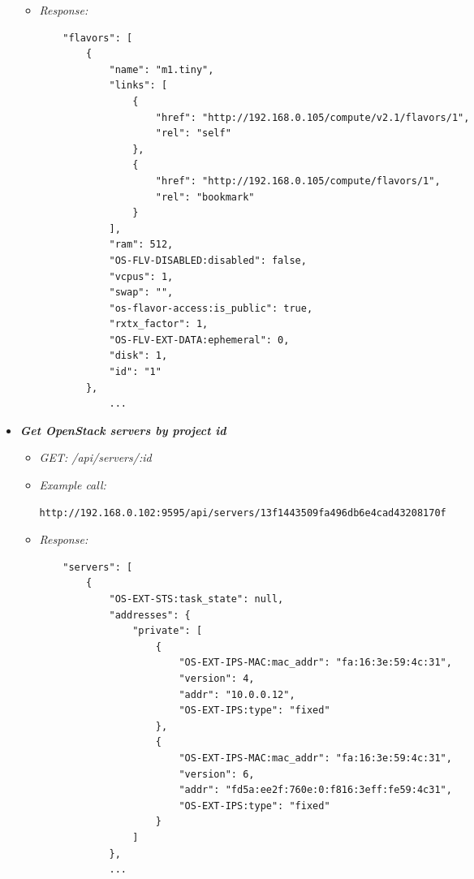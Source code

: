 \begin{itemize}
\begin{itemize}
\item \emph{Response:}
 \begin{lstlisting}
    "flavors": [
        {
            "name": "m1.tiny",
            "links": [
                {
                    "href": "http://192.168.0.105/compute/v2.1/flavors/1",
                    "rel": "self"
                },
                {
                    "href": "http://192.168.0.105/compute/flavors/1",
                    "rel": "bookmark"
                }
            ],
            "ram": 512,
            "OS-FLV-DISABLED:disabled": false,
            "vcpus": 1,
            "swap": "",
            "os-flavor-access:is_public": true,
            "rxtx_factor": 1,
            "OS-FLV-EXT-DATA:ephemeral": 0,
            "disk": 1,
            "id": "1"
        },
            ...
\end{lstlisting}
\end{itemize}


\item \textbf{\textit{Get OpenStack servers by project id}}
\begin{itemize}
\item \emph{GET: /api/servers/:id}
\item \emph{Example call:}
 \begin{lstlisting}
http://192.168.0.102:9595/api/servers/13f1443509fa496db6e4cad43208170f
\end{lstlisting}

\item \emph{Response:}
 \begin{lstlisting}
    "servers": [
        {
            "OS-EXT-STS:task_state": null,
            "addresses": {
                "private": [
                    {
                        "OS-EXT-IPS-MAC:mac_addr": "fa:16:3e:59:4c:31",
                        "version": 4,
                        "addr": "10.0.0.12",
                        "OS-EXT-IPS:type": "fixed"
                    },
                    {
                        "OS-EXT-IPS-MAC:mac_addr": "fa:16:3e:59:4c:31",
                        "version": 6,
                        "addr": "fd5a:ee2f:760e:0:f816:3eff:fe59:4c31",
                        "OS-EXT-IPS:type": "fixed"
                    }
                ]
            },
            ...
\end{lstlisting}
\end{itemize}

\end{itemize}



